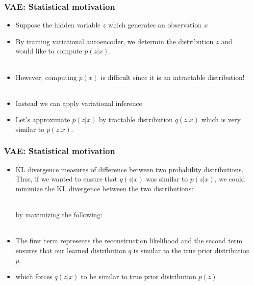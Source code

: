 
\begin{frame}
\frametitle{VAE: Statistical motivation}

\begin{itemize}
\item Suppose the hidden variable $z$ which generates an observation $x$
\pause
\item By training variational autoencoder, we determin the distribution $z$ and would like to compute $p(z|x)$. \\
\\
\vspace{5pt}
\pause
\item \raggedright{However, computing $p(x)$ is difficult since it is an intractable distribution!} \\
\\
\vspace{5pt}
\pause
\item \raggedright{Instead we can apply variational inference} \\
\pause
\item \raggedright{Let's approximate $p(z|x)$ by tractable distribution $q(z|x)$ which is very similar to $p(z|x)$.} \\

\end{itemize}
\end{frame}


\begin{frame}
\frametitle{VAE: Statistical motivation}

\begin{itemize}
\item \raggedright{KL divergence measures of difference between two probability distributions. Thus, if we wanted to ensure that $q(z|x)$ was similar to $p(z|x)$, we could minimize the KL divergence between the two distributions:} \\
 \\
\pause
\raggedright{by maximizing the following:}\\
\paused
{} \\
\vspace{5pt}
\item \raggedright{The first term represents the reconstruction likelihood and the second term ensures that our learned distribution $q$ is similar to the true prior distribution $p$.}
\item which forces $q(z|x)$ to be similar to true prior distribution $p(z)$

\end{itemize}
\end{frame}

